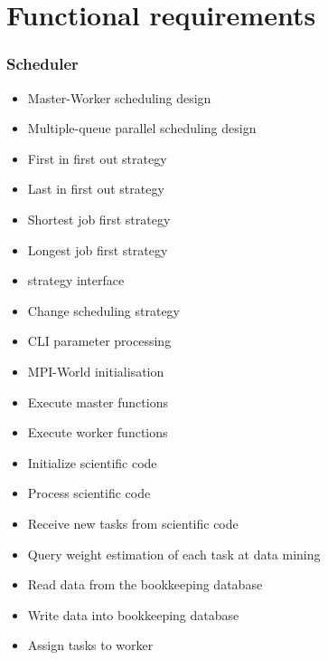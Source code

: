 {


\setcounter{func}{10}
\renewcommand{\labelitemi}{
	\ifnum \value{func}<10$/F 0\arabic{func} /$\addtocounter{func}{10}
	\else $/F \arabic{func} /$\addtocounter{func}{10}\fi
	}

\section{Functional requirements} 
	
	\subsubsection{Scheduler}
	
		\begin{itemize}
			\item Master-Worker scheduling design
			\item Multiple-queue parallel scheduling design
			\item First in first out strategy
			\item Last in first out strategy
			\item Shortest job first strategy
			\item Longest job first strategy 
			\item strategy interface
			\item Change scheduling strategy
			\item CLI parameter processing
			\item MPI-World initialisation
			\item Execute master functions
			\item Execute worker functions
			\item Initialize scientific code
			\item Process scientific code 
			\item Receive new tasks from scientific code
			\item Query weight estimation of each task at data mining
			\item Read data from the bookkeeping database
			\item Write data into bookkeeping database
			\item Assign tasks to worker
		\end{itemize}
	
}
